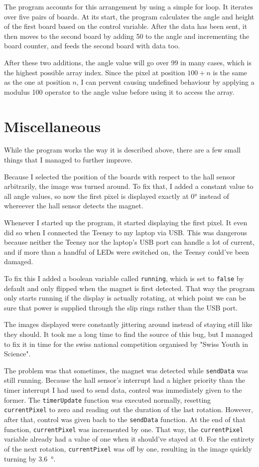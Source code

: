 \documentclass[a4paper, 11pt, titlepage]{report}
\begin{document}
The program accounts for this arrangement by using a simple for loop. It iterates over five pairs
of boards. At its start, the program calculates the angle and height of the first board based on
the control variable. After the data has been sent, it then moves to the second board by adding 50
to the angle and incrementing the board counter, and feeds the second board with data too.

After these two additions, the angle value will go over 99 in many cases, which is the highest
possible array index. Since the pixel at position $100+n$ is the same as the one at position $n$,
I can pervent causing undefined behaviour by applying a modulus 100 operator to the angle value
before using it to access the array.


\section{Miscellaneous}

While the program works the way it is described above, there are a few small things that I managed
to further improve.

Because I selected the position of the boards with respect to the hall sensor arbitrarily, the
image was turned around. To fix that, I added a constant value to all angle values, so now the
first pixel is displayed exactly at 0° instead of whereever the hall sensor detects the magnet.

Whenever I started up the program, it started displaying the first pixel. It even did so when I
connected the Teensy to my laptop via USB. This was dangerous because neither the Teensy nor the
laptop's USB port can handle a lot of current, and if more than a handful of LEDs were switched
on, the Teensy could've been damaged.

To fix this I added a boolean variable called \texttt{running}, which is set to \texttt{false} by
default and only flipped when the magnet is first detected. That way the program only starts
running if the display is actually rotating, at which point we can be sure that power is supplied
through the slip rings rather than the USB port.

The images displayed were constantly jittering around instead of staying still like they should.
It took me a long time to find the source of this bug, but I managed to fix it in time for the
swiss national competition organised by "Swiss Youth in Science".

The problem was that sometimes, the magnet was detected while \texttt{sendData} was still running.
Because the hall sensor's interrupt had a higher priority than the timer interrupt I had used to
send data, control was immediately given to the former. The \texttt{timerUpdate} function was
executed normally, resetting \texttt{currentPixel} to zero and reading out the duration of the
last rotation. However, after that, control was given bach to the \texttt{sendData} function. At
the end of that function, \texttt{currentPixel} was incremented by one. That way, the
\texttt{currentPixel} variable already had a value of one when it should've stayed at 0. For the
entirety of the next rotation, \texttt{currentPixel} was off by one, resulting in the image
quickly turning by \SI{3.6}{\degree}.
\end{document}
